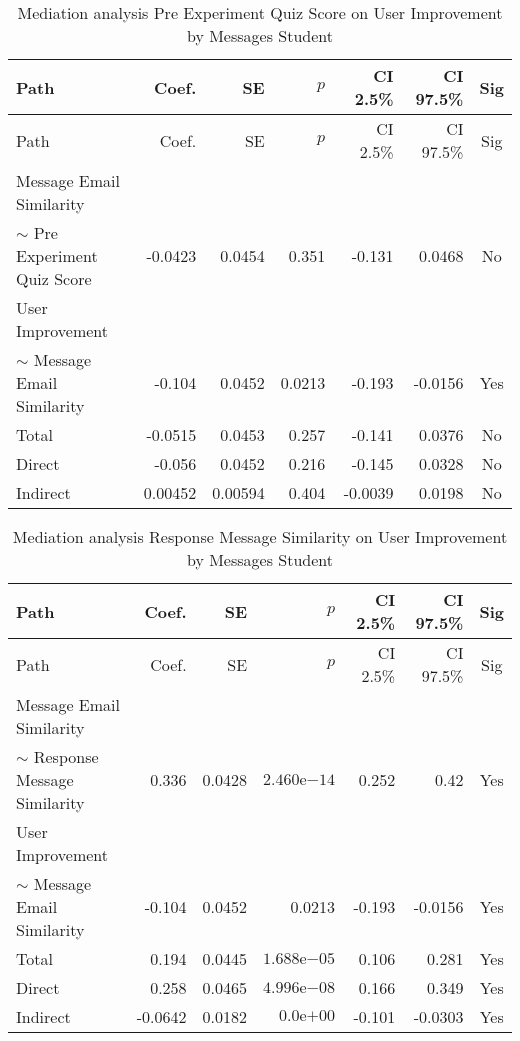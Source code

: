 \begin{longtable}{lrrrrrc}
            \caption{Mediation analysis Pre Experiment Quiz Score on User Improvement by  Messages Student}\label{tab:mediation Pre Experiment Quiz Score on User Improvement by  Messages Student}\\
            \toprule
            Path & Coef. & SE & $p$ & CI 2.5\% & CI 97.5\% & Sig \\
            \midrule
            \endfirsthead
            \toprule
            Path & Coef. & SE & $p$ & CI 2.5\% & CI 97.5\% & Sig \\
            \midrule
            \endhead
            \bottomrule
            \endfoot
            Message Email Similarity\\ $\sim$ Pre Experiment Quiz Score & -0.0423 & 0.0454 & 0.351 & -0.131 & 0.0468 & No \\
User Improvement\\ $\sim$ Message Email Similarity & -0.104 & 0.0452 & 0.0213 & -0.193 & -0.0156 & Yes \\
Total & -0.0515 & 0.0453 & 0.257 & -0.141 & 0.0376 & No \\
Direct & -0.056 & 0.0452 & 0.216 & -0.145 & 0.0328 & No \\
Indirect & 0.00452 & 0.00594 & 0.404 & -0.0039 & 0.0198 & No \\
\end{longtable}

\begin{longtable}{lrrrrrc}
            \caption{Mediation analysis Response Message Similarity on User Improvement by  Messages Student}\label{tab:mediation Response Message Similarity on User Improvement by  Messages Student}\\
            \toprule
            Path & Coef. & SE & $p$ & CI 2.5\% & CI 97.5\% & Sig \\
            \midrule
            \endfirsthead
            \toprule
            Path & Coef. & SE & $p$ & CI 2.5\% & CI 97.5\% & Sig \\
            \midrule
            \endhead
            \bottomrule
            \endfoot
            Message Email Similarity\\ $\sim$ Response Message Similarity & 0.336 & 0.0428 & $2.460\mathrm{e}{-14}$ & 0.252 & 0.42 & Yes \\
User Improvement\\ $\sim$ Message Email Similarity & -0.104 & 0.0452 & 0.0213 & -0.193 & -0.0156 & Yes \\
Total & 0.194 & 0.0445 & $1.688\mathrm{e}{-05}$ & 0.106 & 0.281 & Yes \\
Direct & 0.258 & 0.0465 & $4.996\mathrm{e}{-08}$ & 0.166 & 0.349 & Yes \\
Indirect & -0.0642 & 0.0182 & $0.0\mathrm{e}{+00}$ & -0.101 & -0.0303 & Yes \\
\end{longtable}

